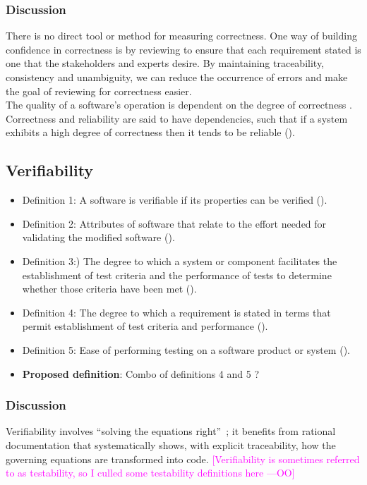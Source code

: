 \documentclass[letterpaper,cleveref]{lipics-v2019}
\newcommand{\authornote}[3]{\textcolor{#1}{[#3 ---#2]}}
\newcommand{\authornote}[3]{}
\newcommand{\oo}[1]{\authornote{magenta}{OO}{#1}} %
\theoremstyle{definition}
\begin{document}
\subsubsection{Discussion}
There is no direct tool or
method for measuring correctness. One way of building confidence in correctness
is by reviewing to ensure that each requirement stated is one that the
stakeholders and experts desire.  By maintaining traceability, consistency and
unambiguity, we can reduce the occurrence of errors and make the goal of
reviewing for correctness easier.\\
 The quality of a software's operation is dependent on the degree of correctness \cite{berander2005software}. Correctness and reliability are said to have dependencies, such that if a system exhibits a high degree of correctness then it tends to be reliable (\cite{GhezziEtAl2003}).

\subsection{Verifiability}
\begin{itemize}
	\item{Definition 1:} A software is verifiable if its properties can be verified (\cite{GhezziEtAl2003}).\\
	\item{Definition 2:} Attributes of software that relate to the effort needed for validating the modified software (\cite{berander2005software}).\\
	\item{Definition 3:}) The degree to which a system or component facilitates the establishment of test criteria and the performance of tests to determine whether those criteria have been met (\cite{IEEEStdGlossarySET1990}).\\
	\item{Definition 4:}  The degree to which a requirement is stated in terms that permit establishment of test criteria and performance (\cite{IEEEStdGlossarySET1990}).\\
	\item{Definition 5:} Ease of performing testing on a software product or system (\cite{IEEEStdGlossarySET1990}).\\
	\item{\textbf{Proposed definition}:} Combo of definitions 4 and 5 ?\\
\end{itemize}
\subsubsection{Discussion}
Verifiability involves ``solving the equations right''~\cite[p.~23]{Roache1998};
it benefits from rational documentation that systematically shows, with explicit
traceability, how the governing equations are transformed into code.
\oo{Verifiability is sometimes referred to as testability, so I culled some testability definitions here}\\
\end{document}
